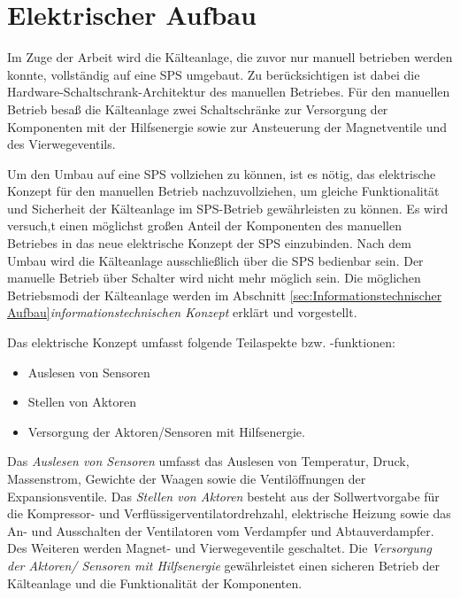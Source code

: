 \section{Elektrischer Aufbau}
\label{sec:Elektrischer Aufbau}
Im Zuge der Arbeit wird die Kälteanlage, die zuvor nur manuell betrieben werden konnte, vollständig auf eine SPS umgebaut. Zu berücksichtigen ist dabei die Hardware-Schaltschrank-Architektur des manuellen Betriebes. Für den manuellen Betrieb besaß die Kälteanlage zwei Schaltschränke zur Versorgung der Komponenten mit der Hilfsenergie sowie zur Ansteuerung der Magnetventile und des Vierwegeventils.

Um den Umbau auf eine SPS vollziehen zu können, ist es nötig, das elektrische Konzept für den manuellen Betrieb nachzuvollziehen, um  gleiche Funktionalität und Sicherheit der Kälteanlage im SPS-Betrieb gewährleisten zu können. Es wird versuch,t einen möglichst großen Anteil der Komponenten des manuellen Betriebes  in das neue elektrische Konzept der SPS einzubinden. Nach dem Umbau wird die Kälteanlage ausschließlich über die SPS bedienbar sein. Der manuelle Betrieb über Schalter wird nicht mehr möglich sein. Die möglichen Betriebsmodi der Kälteanlage werden im Abschnitt \ref{sec:Informationstechnischer Aufbau}\textit{informationstechnischen Konzept} erklärt und vorgestellt. 

Das elektrische Konzept umfasst folgende Teilaspekte bzw. -funktionen:

\begin{itemize}
\item Auslesen von Sensoren
\item Stellen von Aktoren 
\item Versorgung der Aktoren/Sensoren mit Hilfsenergie.
\end{itemize}

Das \textit{Auslesen von Sensoren} umfasst das Auslesen von Temperatur, Druck, Massenstrom, Gewichte der Waagen sowie die Ventilöffnungen der Expansionsventile. Das \textit{Stellen von Aktoren} besteht aus der Sollwertvorgabe für die Kompressor- und Verflüssigerventilatordrehzahl, elektrische Heizung sowie das An- und Ausschalten der Ventilatoren vom Verdampfer und Abtauverdampfer. Des Weiteren werden Magnet- und Vierwegeventile geschaltet. 
Die \textit{Versorgung der Aktoren/ Sensoren mit Hilfsenergie} gewährleistet einen sicheren Betrieb der Kälteanlage und die Funktionalität der Komponenten.  

